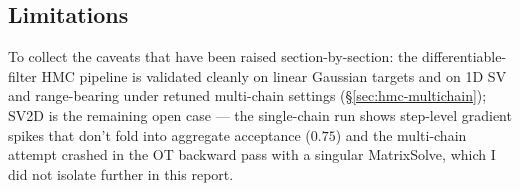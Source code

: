 \documentclass{article}
\begin{document}
\subsection{Limitations}

To collect the caveats that have been raised section-by-section: the differentiable-filter HMC pipeline is validated cleanly on linear Gaussian targets and on 1D SV and range-bearing under retuned multi-chain settings (\S\ref{sec:hmc-multichain}); SV2D is the remaining open case --- the single-chain run shows step-level gradient spikes that don't fold into aggregate acceptance ($0.75$) and the multi-chain attempt crashed in the OT backward pass with a singular MatrixSolve, which I did not isolate further in this report.
% 
% 
% 
% 
% 
% 
% 
\end{document}
